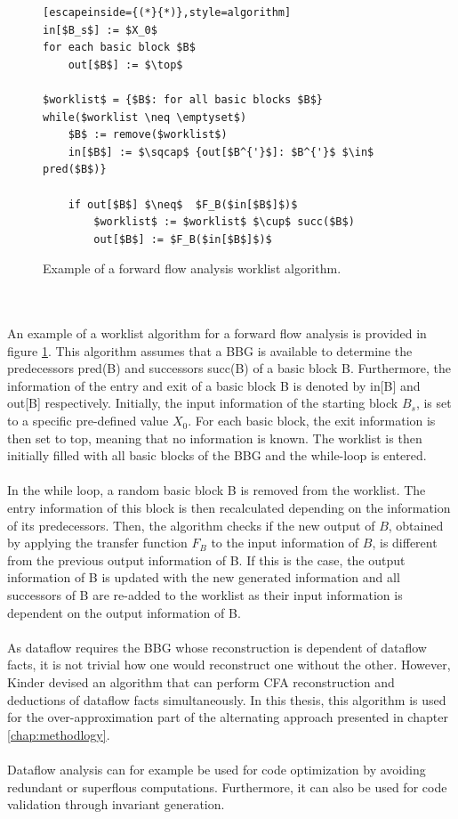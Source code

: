\documentclass{kththesis}
\begin{document}
\begin{figure}[t]
    \centering
\begin{lstlisting}[escapeinside={(*}{*)},style=algorithm]
in[$B_s$] := $X_0$
for each basic block $B$
    out[$B$] := $\top$
    
$worklist$ = {$B$: for all basic blocks $B$}
while($worklist \neq \emptyset$)
    $B$ := remove($worklist$)
    in[$B$] := $\sqcap$ {out[$B^{'}$]: $B^{'}$ $\in$ pred($B$)}
    
    if out[$B$] $\neq$  $F_B($in[$B$]$)$
        $worklist$ := $worklist$ $\cup$ succ($B$)
        out[$B$] := $F_B($in[$B$]$)$
\end{lstlisting}
\caption[Example of a forward flow analysis worklist algorithm.]{Example of a forward flow analysis worklist algorithm.}
    \label{fig:WorklistAlgo}
\end{figure}
\noindent
\\ \\
An example of a worklist algorithm for a forward flow analysis is provided in figure \ref{fig:WorklistAlgo}. This algorithm assumes that a BBG is available to determine the predecessors pred(B) and successors succ(B) of a basic block B. Furthermore, the information of the entry and exit of a basic block B is denoted by in[B] and out[B] respectively. Initially, the  input information of the starting block $B_s$, is set to a specific pre-defined value $X_0$. For each basic block, the exit information is then set to top, meaning that no information is known. The worklist is then initially filled with all basic blocks of the BBG and the while-loop is entered.
\\ \\
In the while loop, a random basic block B is removed from the worklist. The entry information of this block is then recalculated depending on the information of its predecessors. Then, the algorithm checks if the new output of $B$, obtained by applying the transfer function $F_B$ to the input information of $B$, is different from the previous output information of B. If this is the case, the output information of B is updated with the new generated information and all successors of B are re-added to the worklist as their input information is dependent on the output information of B.
\\ \\
As dataflow requires the BBG whose reconstruction is dependent of dataflow facts, it is not trivial how one would reconstruct one without the other. However, Kinder\cite{Jakstab} devised an algorithm that can perform CFA reconstruction and deductions of dataflow facts simultaneously. In this thesis, this algorithm is used for the over-approximation part of the alternating approach presented in chapter \ref{chap:methodlogy}.
\\ \\ 
Dataflow analysis can for example be used for code optimization by avoiding redundant or superflous computations. Furthermore, it can also be used for code validation through invariant generation\cite{BordeauxSoftwareVerification}.
\end{document}

